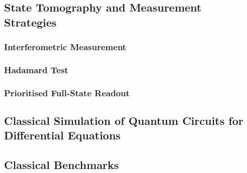 \subsection{State Tomography and Measurement Strategies}

\subsubsection{Interferometric Measurement}

\subsubsection{Hadamard Test}

\subsubsection{Prioritised Full-State Readout}

\subsection{Classical Simulation of Quantum Circuits for Differential Equations}

\subsection{Classical Benchmarks}
